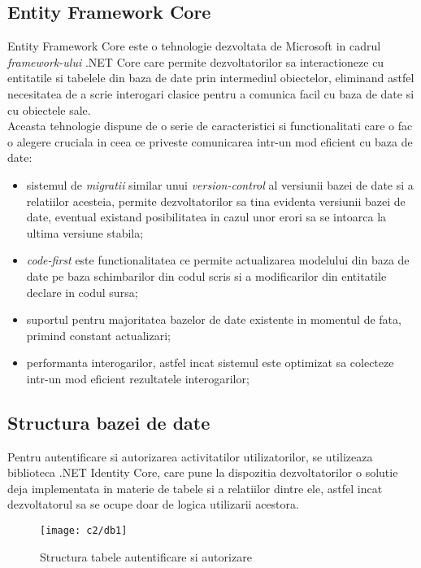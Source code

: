  \subsection*{Entity Framework Core}
Entity Framework Core este o tehnologie dezvoltata de Microsoft in cadrul \textit{framework-ului} .NET Core care permite dezvoltatorilor sa interactioneze cu entitatile si tabelele din baza de date prin intermediul obiectelor, eliminand astfel necesitatea de a scrie interogari clasice pentru a comunica facil cu baza de date si cu obiectele sale.\\
Aceasta tehnologie dispune de o serie de caracteristici si functionalitati care o fac o alegere cruciala in ceea ce priveste comunicarea intr-un mod eficient cu baza de date:
\begin{itemize}
	
	\item sistemul de \textit{migratii} similar unui \textit{version-control} al versiunii bazei de date si a relatiilor acesteia, permite dezvoltatorilor sa tina evidenta versiunii bazei de date, eventual existand posibilitatea in cazul unor erori sa se intoarca la ultima versiune stabila;
	
	\item \textit{code-first} este functionalitatea ce permite actualizarea modelului din baza de date pe baza schimbarilor din codul scris si a modificarilor din entitatile declare in codul sursa;
	
	\item suportul pentru majoritatea bazelor de date existente in momentul de fata, primind constant actualizari;
	
	\item performanta interogarilor, astfel incat sistemul este optimizat sa colecteze intr-un mod eficient rezultatele interogarilor;
	 
\end{itemize}

\subsection*{Structura bazei de date}

Pentru autentificare si autorizarea activitatilor utilizatorilor, se utilizeaza biblioteca .NET Identity Core, care pune la dispozitia dezvoltatorilor o solutie deja implementata in materie de tabele si a relatiilor dintre ele, astfel incat dezvoltatorul sa se ocupe doar de logica utilizarii acestora.
 
\vspace{1cm}
\begin{figure}[h]
	\centering
	
	\texttt{[image: c2/db1]}
	\caption{Structura tabele autentificare si autorizare}
\end{figure}

